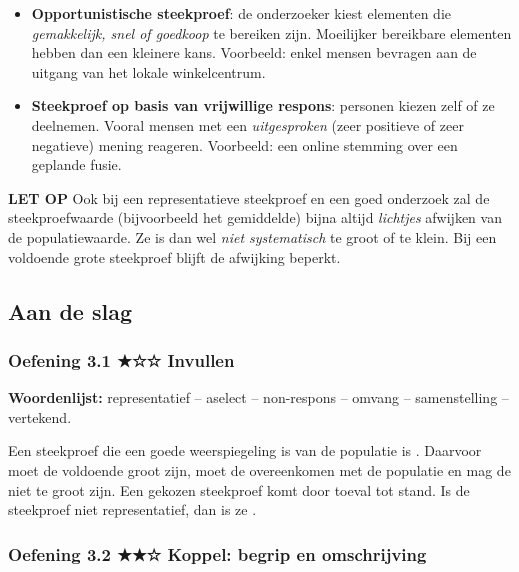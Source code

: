 \begin{theorie}
\begin{itemize}
\item \textbf{Opportunistische steekproef}: de onderzoeker kiest elementen die \emph{gemakkelijk, snel of goedkoop} te bereiken zijn. Moeilijker bereikbare elementen hebben dan een kleinere kans. Voorbeeld: enkel mensen bevragen aan de uitgang van het lokale winkelcentrum.
\item \textbf{Steekproef op basis van vrijwillige respons}: personen kiezen zelf of ze deelnemen. Vooral mensen met een \emph{uitgesproken} (zeer positieve of zeer negatieve) mening reageren. Voorbeeld: een online stemming over een geplande fusie.
\end{itemize}
\end{theorie}

\begin{letop}
\textbf{LET OP} \quad Ook bij een representatieve steekproef en een goed onderzoek zal de steekproefwaarde (bijvoorbeeld het gemiddelde) bijna altijd \emph{lichtjes} afwijken van de populatiewaarde. Ze is dan wel \emph{niet systematisch} te groot of te klein. Bij een voldoende grote steekproef blijft de afwijking beperkt.
\end{letop}

\subsection*{Aan de slag}

\subsubsection*{Oefening 3.1 \quad ★☆☆ \quad Invullen}

\textbf{Woordenlijst:} representatief – aselect – non-respons – omvang – samenstelling – vertekend.

Een steekproef die een goede weerspiegeling is van de populatie is . Daarvoor moet de  voldoende groot zijn, moet de  overeenkomen met de populatie en mag de  niet te groot zijn. Een  gekozen steekproef komt door toeval tot stand. Is de steekproef niet representatief, dan is ze .

\subsubsection*{Oefening 3.2 \quad ★★☆ \quad Koppel: begrip en omschrijving}

